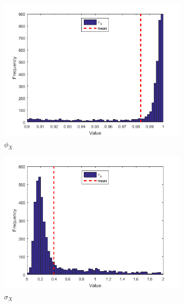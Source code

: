 \documentclass[11pt,a4,twosided,singlespacing,titlepagenumber=on]{scrreprt}
\numberwithin{equation}{chapter} %
\theoremstyle{remark}
\begin{document}
\begin{figure}[H]
    \centering
    \begin{subfigure}[t]{0.32\textwidth}
        \centering
        \includegraphics[width=1\textwidth]{res/params/1462_2192/1}
        \caption{$\phi_X$}
    \end{subfigure}
    \begin{subfigure}[t]{0.32\textwidth}
        \centering
        \includegraphics[width=1\textwidth]{res/params/1462_2192/2}
        \caption{$\sigma_X$}
    \end{subfigure}
    \begin{subfigure}[t]{0.32\textwidth}
        \centering

\end{subfigure}
\end{figure}
\end{document}
